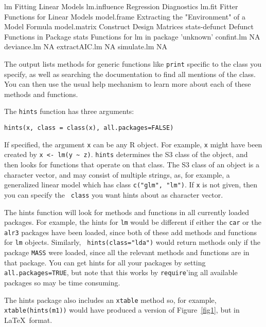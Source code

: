\documentclass{report}
\begin{document}
\begin{article}
\begin{figure*}[hbt]
\begin{Schunk}
\begin{Soutput}
lm                            Fitting Linear Models
lm.influence                  Regression Diagnostics
lm.fit                        Fitter Functions for Linear Models
model.frame                   Extracting the "Environment" of a Model Formula
model.matrix                  Construct Design Matrices
stats-defunct                 Defunct Functions in Package stats
Functions for lm in package 'unknown'
confint.lm                    NA
deviance.lm                   NA
extractAIC.lm                 NA
simulate.lm                   NA
\end{Soutput}
\end{Schunk}
\caption{\label{fig1} Hints for the {\tt lm} class.}
\end{figure*}

The output lists methods for generic functions like {\tt print} specific to
the class you specify, as well as searching the documentation to find all
mentions of the class. You can then use the usual help mechanism to learn more
about each of these methods and functions.

The {\tt hints} function has three arguments:

\begin{verbatim}
hints(x, class = class(x), all.packages=FALSE)
\end{verbatim}
If specified, the argument {\tt x} can be any R object. For example, {\tt x}
might have been created by \verb|x <- lm(y ~ z)|. {\tt hints} determines the
S3 class of the object, and then looks for functions that operate on that
class. The S3 class of an object is a character vector, and may consist of
multiple strings, as, for example, a generalized linear model which has class
{\tt c("glm", "lm")}. If {\tt x} is not given, then you can specify the {\tt
class} you want hints about as character vector.

The hints function will look for methods and functions in all
currently loaded packages. For example, the hints for {\tt lm}
would be different if either the {\tt car} or the {\tt alr3}
packages have been loaded, since both of these add methods and
functions for {\tt lm} objects. Similarly, {\tt
hints(class="lda")} would return methods only if the package
{\tt MASS} were loaded, since all the relevant methods and
functions are in that package. You can get hints for all your
packages by setting {\tt all.packages=TRUE}, but note that this works by {\tt require}'ing all available packages so may be time consuming.

The hints package also includes an {\tt xtable} method so, for 
example, {\tt xtable(hints(m1))} would have produced a version 
of Figure~\ref{fig1}, but in \LaTeX\ format. 


\end{article}
\end{document}
